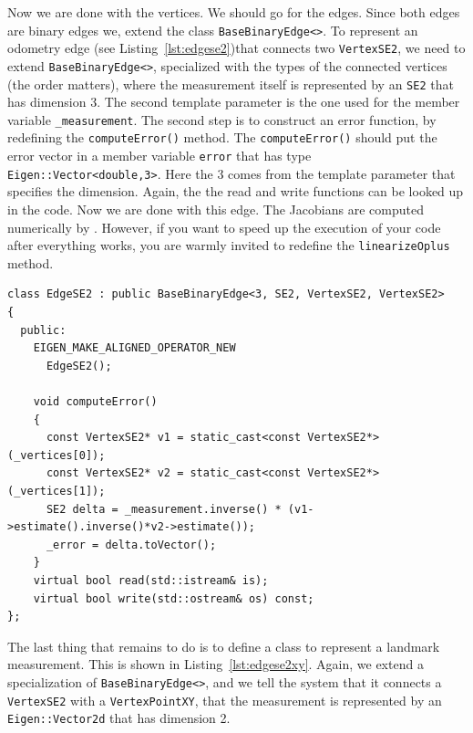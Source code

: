 \documentclass[a4paper]{article}
\begin{document}
Now we are done with the vertices. We should go for the edges.  Since
both edges are binary edges we, extend the class
\verb+BaseBinaryEdge<>+.
To represent an odometry edge (see Listing~\ref{lst:edgese2})that
connects two \verb+VertexSE2+, we need to extend 
\verb+BaseBinaryEdge<>+,  specialized with the types of the
connected vertices (the order matters), where the measurement itself
is represented by an \verb+SE2+ that has dimension 3. The second
template parameter is the one used for the member variable
\verb+_measurement+.  The second step is to construct an error
function, by redefining the \verb+computeError()+ method.  The
\verb+computeError()+ should put the error vector in a member variable
\verb+error+ that has type \verb+Eigen::Vector<double,3>+. Here the 3
comes from the template parameter that specifies the dimension.
Again, the the read and write functions can be looked up in the code.
Now we are done with this edge. The Jacobians are computed numerically
by \gopt{}.  However, if you want to speed up the execution of your
code after everything works, you are warmly invited to redefine the
\verb+linearizeOplus+ method.

\begin{lstlisting}[float,label=lst:edgese2,caption=\text{Edge connecting two
  robot poses, for example, the odometry of the robot.}]
class EdgeSE2 : public BaseBinaryEdge<3, SE2, VertexSE2, VertexSE2>
{
  public:
    EIGEN_MAKE_ALIGNED_OPERATOR_NEW
      EdgeSE2();

    void computeError()
    {
      const VertexSE2* v1 = static_cast<const VertexSE2*>(_vertices[0]);
      const VertexSE2* v2 = static_cast<const VertexSE2*>(_vertices[1]);
      SE2 delta = _measurement.inverse() * (v1->estimate().inverse()*v2->estimate());
      _error = delta.toVector();
    }
    virtual bool read(std::istream& is);
    virtual bool write(std::ostream& os) const;
};
\end{lstlisting}

The last thing that remains to do is to define a class to represent a
landmark measurement.  This is shown in Listing~\ref{lst:edgese2xy}.
Again, we extend a specialization of \verb+BaseBinaryEdge<>+, and we
tell the system that it connects a \verb+VertexSE2+ with a
\verb+VertexPointXY+, that the measurement is represented by an
\verb+Eigen::Vector2d+ that has dimension 2.
\end{document}
